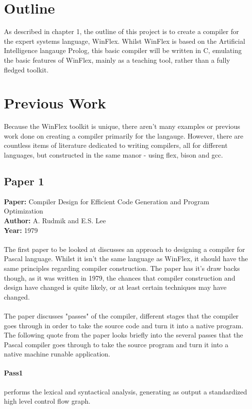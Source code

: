 \documentclass[12pt]{report}
\begin{document}
\section{Outline}\label{sec:outline}
As described in chapter 1, the outline of this project is to create a compiler for the expert systems language, WinFlex.  Whilst WinFlex is based on the Artificial Intelligence langauge Prolog, this basic compiler will be written in C, emulating the basic features of WinFlex, mainly as a teaching tool, rather than a fully fledged toolkit.

\section{Previous Work}\label{sec:previous_work}
Because the WinFlex toolkit is unique, there aren't many examples or previous work done on creating a compiler primarily for the langauge.  However, there are countless items of literature dedicated to writing compilers, all for different languages, but constructed in the same manor - using flex, bison and gcc.

\subsection{Paper 1}\label{subsec:paper1}
\textbf{Paper:} Compiler Design for Efficient Code Generation and Program Optimization\\
\textbf{Author:} A. Rudmik and E.S. Lee\\
\textbf{Year:} 1979\\
\\
The first paper to be looked at discusses an approach to designing a compiler for Pascal language.  Whilst it isn't the same language as WinFlex, it should have the same principles regarding compiler construction.  The paper has it's draw backs though, as it was written in 1979, the chances that compiler construction and design have changed is quite likely, or at least certain techniques may have changed.\\
\\
The paper discusses "passes" of the compiler, different stages that the compiler goes through in order to take the source code and turn it into a native program.  The following quote from the paper looks briefly into the several passes that the Pascal compiler goes through to take the source program and turn it into a native machine runable application.
\paragraph{Pass1} performs the lexical and syntactical analysis, generating as output a standardized high level control flow graph.
\end{document}
